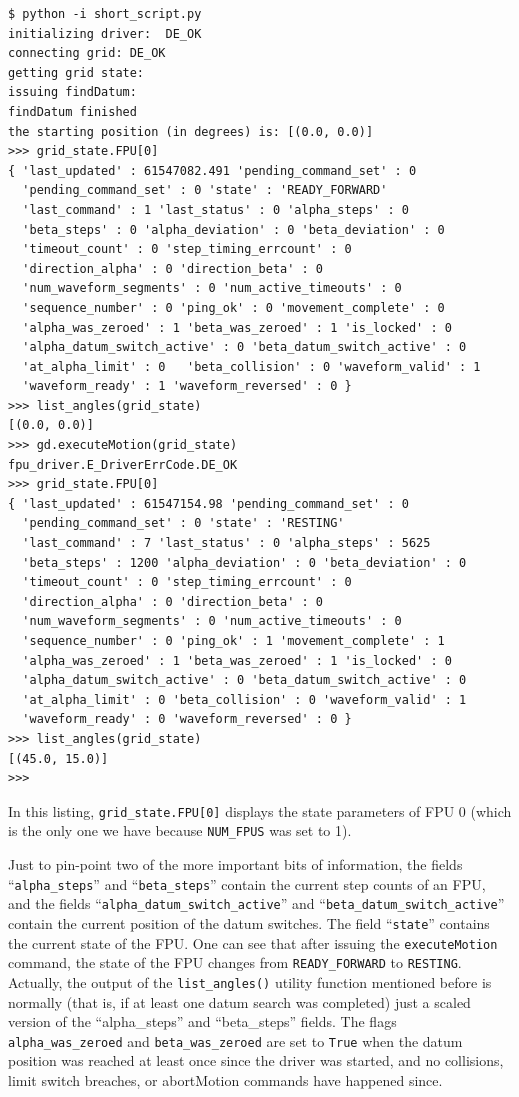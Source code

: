 \documentclass[11pt,a4paper]{scrartcl}
\begin{document}
\begin{verbatim}
$ python -i short_script.py
initializing driver:  DE_OK
connecting grid: DE_OK
getting grid state:
issuing findDatum:
findDatum finished
the starting position (in degrees) is: [(0.0, 0.0)]
>>> grid_state.FPU[0]
{ 'last_updated' : 61547082.491 'pending_command_set' : 0
  'pending_command_set' : 0 'state' : 'READY_FORWARD'
  'last_command' : 1 'last_status' : 0 'alpha_steps' : 0
  'beta_steps' : 0 'alpha_deviation' : 0 'beta_deviation' : 0
  'timeout_count' : 0 'step_timing_errcount' : 0
  'direction_alpha' : 0 'direction_beta' : 0
  'num_waveform_segments' : 0 'num_active_timeouts' : 0
  'sequence_number' : 0 'ping_ok' : 0 'movement_complete' : 0
  'alpha_was_zeroed' : 1 'beta_was_zeroed' : 1 'is_locked' : 0
  'alpha_datum_switch_active' : 0 'beta_datum_switch_active' : 0
  'at_alpha_limit' : 0   'beta_collision' : 0 'waveform_valid' : 1
  'waveform_ready' : 1 'waveform_reversed' : 0 }
>>> list_angles(grid_state)
[(0.0, 0.0)]
>>> gd.executeMotion(grid_state)
fpu_driver.E_DriverErrCode.DE_OK
>>> grid_state.FPU[0]
{ 'last_updated' : 61547154.98 'pending_command_set' : 0
  'pending_command_set' : 0 'state' : 'RESTING'
  'last_command' : 7 'last_status' : 0 'alpha_steps' : 5625
  'beta_steps' : 1200 'alpha_deviation' : 0 'beta_deviation' : 0
  'timeout_count' : 0 'step_timing_errcount' : 0
  'direction_alpha' : 0 'direction_beta' : 0
  'num_waveform_segments' : 0 'num_active_timeouts' : 0
  'sequence_number' : 0 'ping_ok' : 1 'movement_complete' : 1
  'alpha_was_zeroed' : 1 'beta_was_zeroed' : 1 'is_locked' : 0
  'alpha_datum_switch_active' : 0 'beta_datum_switch_active' : 0
  'at_alpha_limit' : 0 'beta_collision' : 0 'waveform_valid' : 1
  'waveform_ready' : 0 'waveform_reversed' : 0 }
>>> list_angles(grid_state)
[(45.0, 15.0)]
>>>
\end{verbatim}

In this listing, \verb+grid_state.FPU[0]+ displays the state parameters of
FPU 0 (which is the only one we have because \texttt{NUM\_FPUS} was
set to 1).

\begin{sloppypar}
Just to pin-point two of the more important bits of information, the
fields ``\texttt{alpha\_steps}'' and ``\texttt{beta\_steps}'' contain
the current step counts of an FPU, and the fields
``\texttt{alpha\_datum\_switch\_active}'' and
``\texttt{beta\_datum\_switch\_active}'' contain the current position
of the datum switches. The field ``\texttt{state}'' contains the
current state of the FPU. One can see that after issuing the
\texttt{executeMotion} command, the state of the FPU changes from
\texttt{READY\_FORWARD} to \texttt{RESTING}. Actually, the output of
the \texttt{list\_angles()} utility function mentioned before is
normally (that is, if at least one datum search was completed) just a
scaled version of the ``alpha\_steps'' and ``beta\_steps'' fields. The
flags \texttt{alpha\_was\_zeroed} and \texttt{beta\_was\_zeroed} are
set to \texttt{True} when the datum position was reached at least once
since the driver was started, and no collisions, limit switch
breaches, or abortMotion commands have happened since.
\end{sloppypar}
\end{document}
